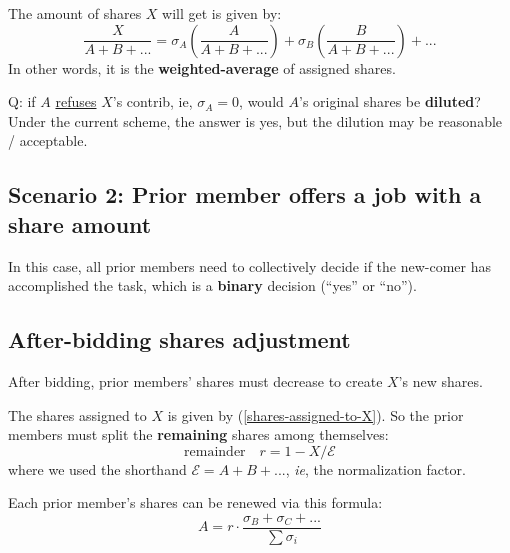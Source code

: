 \documentclass[12pt, orivec]{article}
\begin{document}
The amount of shares $X$ will get is given by:
\begin{equation}
\label{shares-assigned-to-X}
\frac{X}{A + B + ...} = \sigma_A (\frac{A}{A + B + ...}) + \sigma_B (\frac{B}{A + B + ...}) + ...
\end{equation}
In other words, it is the \textbf{weighted-average} of assigned shares.

Q:  if $A$ \uline{refuses} $X$'s contrib, ie, $\sigma_A = 0$, would $A$'s original shares be \textbf{diluted}?  Under the current scheme, the answer is yes, but the dilution may be reasonable / acceptable.


\subsection{Scenario 2:  Prior member offers a job with a share amount}

In this case, all prior members need to collectively decide if the new-comer has accomplished the task, which is a \textbf{binary} decision (``yes'' or ``no'').


\subsection{After-bidding shares adjustment}

After bidding, prior members' shares must decrease to create $X$'s new shares.

The shares assigned to $X$ is given by (\ref{shares-assigned-to-X}).  So the prior members must split the \textbf{remaining} shares among themselves:
\begin{equation}
\boxed{\mbox{remainder}} \quad r = 1 - X / \mathcal{E}
\end{equation}
where we used the shorthand $\mathcal{E} = A + B + ...$, \textit{ie}, the normalization factor.

Each prior member's shares can be renewed via this formula:
\begin{equation}
A = r \cdot \frac{\sigma_B + \sigma_C + ...}{\sum \sigma_i}
\end{equation}

\printbibliography
\end{document}
